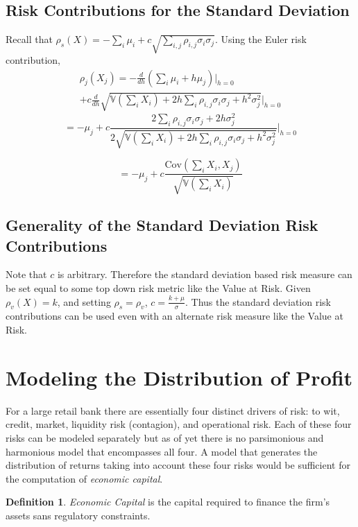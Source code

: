 \documentclass[12pt]{article}
\theoremstyle{definition}
\newtheorem{riskmeasure}{Definition}
\begin{document}
\subsection{Risk Contributions for the Standard Deviation}
Recall that \(\rho_s (X)=-\sum_i \mu_i + c\sqrt{\sum_{i, j} \rho_{i, j} \sigma_i \sigma_j }\).  Using the Euler risk contribution,
\begin{multline*} \rho_j(X_j)=-\frac{d}{dh}\left(\sum_{i} \mu_i + h\mu_j \right)  \bigg|_{h=0} \\+c\frac{d}{dh} \sqrt{\mathbb{V}\left(\sum_{i} X_i\right)+2h\sum_i \rho_{i, j} \sigma_i \sigma_j +h^2 \sigma_j ^2 }  \Bigg|_{h=0}\end{multline*}
\[=-\mu_j + c \frac{2 \sum_i \rho_{i, j} \sigma_i \sigma_j + 2 h \sigma_j ^2}{2 \sqrt{\mathbb{V}\left(\sum_{i}X_i\right)+2h\sum_i \rho_{i, j} \sigma_i \sigma_j +h^2 \sigma_j ^2 }}  \bigg|_{h=0}\]

\[=-\mu_j+c \frac{\text{Cov}(\sum_i X_i, X_j)}{\sqrt{\mathbb{V}(\sum_i X_i)}}\]

\subsection{Generality of the Standard Deviation Risk Contributions}

Note that \(c\) is arbitrary.  Therefore the standard deviation based risk measure can be set equal to some top down risk metric like the Value at Risk.  Given \(\rho_v (X)=k\), and setting \(\rho_s=\rho_v\), \(c=\frac{k+\mu}{\sigma}\).  Thus the standard deviation risk contributions can be used even with an alternate risk measure like the Value at Risk. 

\section{Modeling the Distribution of Profit}
For a large retail bank there are essentially four distinct drivers of risk: to wit, credit, market, liquidity risk (contagion), and operational risk.  Each of these four risks can be modeled separately but as of yet there is no parsimonious and harmonious model that encompasses all four.    A model that generates the distribution of returns taking into account these four risks would be sufficient for the computation of \emph{economic capital}.
\begin{riskmeasure}  
\emph{Economic Capital} is the capital required to finance the firm's assets sans regulatory constraints.
\end{riskmeasure}
\end{document}
